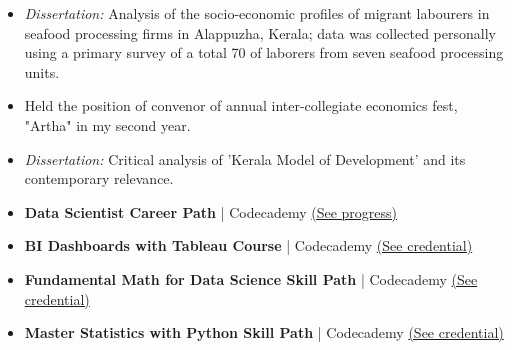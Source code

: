 \documentclass[9pt,a4paper]{altacv}
\begin{document}
\begin{paracol}{2}
\begin{itemize}
    \item \textit{Dissertation:} Analysis of the socio-economic profiles of migrant labourers in seafood processing firms in Alappuzha, Kerala; data was collected personally using a primary survey of a total 70 of laborers from seven seafood processing units.
    \item Held the position of convenor of annual inter-collegiate economics fest, "Artha" in my second year.
\end{itemize}
\divider
{}
\begin{itemize}
    \item \textit{Dissertation:} Critical analysis of ’Kerala Model of Development’ and its contemporary relevance.
\end{itemize}

\begin{itemize}
    \item \textbf{Data Scientist Career Path} | Codecademy  \hfill \href{https://www.codecademy.com/profiles/chackoBabu5183926104?next=true}{(See progress)}
    \item \textbf{BI Dashboards with Tableau Course} | Codecademy  \hfill \href{https://www.codecademy.com/profiles/chackoBabu5183926104/certificates/050d7cf465567fdd0c9abb1fbf20e269}{(See credential)}
    \item \textbf{Fundamental Math for Data Science Skill Path} | Codecademy  \hfill \href{https://www.codecademy.com/profiles/chackoBabu5183926104/certificates/60fae94455bc86001687f1d9}{(See credential)}
    \item \textbf{Master Statistics with Python Skill Path} | Codecademy  \hfill \href{https://www.codecademy.com/profiles/chackoBabu5183926104/certificates/5fd12100603a6c0012428fe7}{(See credential)}
  \end{itemize}

\switchcolumn
{}



\end{paracol}
\end{document}
